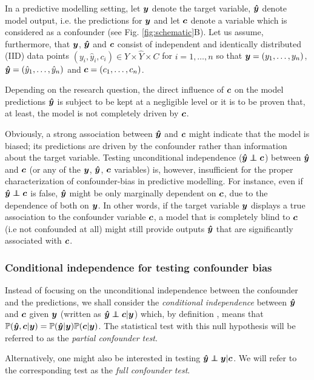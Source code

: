 \documentclass{article}
\begin{document}
In a predictive modelling setting, let $\boldsymbol{y}$ denote the target variable, $\boldsymbol{\hat{y}}$ denote model output, i.e. the predictions for $\boldsymbol{y}$ and let $\boldsymbol{c}$ denote a variable which is considered as a confounder (see Fig. \ref{fig:schematic}B). Let us assume, furthermore, that $\boldsymbol{y}$, $\boldsymbol{\hat{y}}$ and $\boldsymbol{c}$ consist of independent and identically distributed (IID) data points $(y_i, \hat{y}_i, c_i) \in Y \times \hat{Y} \times C$ for $i=1, \dots , n$ so that $\boldsymbol{y}=(y_1, \dots ,y_n)$, $\boldsymbol{\hat{y}}=(\hat{y}_1, \dots, \hat{y}_n)$ and $\boldsymbol{c}=(c_1, \dots, c_n)$. 

Depending on the research question, the direct influence of $\boldsymbol{c}$ on the model predictions $\boldsymbol{\hat{y}}$ is subject to be kept at a negligible level or it is to be proven that, at least, the model is not completely driven by $\boldsymbol{c}$.

Obviously, a strong association between $\boldsymbol{\hat{y}}$ and $\boldsymbol{c}$ might indicate that the model is biased; its predictions are driven by the confounder rather than information about the target variable.
Testing unconditional independence ($\yhat \independent \c$) between $\boldsymbol{\hat{y}}$ and $\boldsymbol{c}$ (or any of the $\boldsymbol{y}$, $\boldsymbol{\hat{y}}$, $\boldsymbol{c}$ variables) is, however, insufficient for the proper characterization of confounder-bias in predictive modelling.
For instance, even if $\yhat \independent \c$ is false, $\boldsymbol{\hat{y}}$ might be only marginally dependent on $\boldsymbol{c}$, due to the dependence of both on $\boldsymbol{y}$. In other words, if the target variable $\boldsymbol{y}$ displays a true association to the confounder variable $\boldsymbol{c}$, a model that is completely blind to $\boldsymbol{c}$ (i.e not confounded at all) might still provide outputs $\boldsymbol{\hat{y}}$ that are significantly associated with $\boldsymbol{c}$.

\subsubsection*{Conditional independence for testing confounder bias}

Instead of focusing on the unconditional independence between the confounder and the predictions, we shall consider the \emph{conditional independence} between $\boldsymbol{\hat{y}}$ and $\boldsymbol{c}$ given $\boldsymbol{y}$ (written as $\yhat \independent \c | \y$) which, by definition \citep{dawid1979conditional}, means that $\mathbb{P}(\boldsymbol{\hat{y}}, \boldsymbol{c}|\boldsymbol{y}) = \mathbb{P}(\boldsymbol{\hat{y}}|\boldsymbol{y})\mathbb{P}(\boldsymbol{c}|\boldsymbol{y})$. The statistical test with this null hypothesis will be referred to as the \emph{partial confounder test}.

Alternatively, one might also be interested in testing $\yhat \independent \y | \c$. We will refer to the corresponding test as the \emph{full confounder test}.
\end{document}
